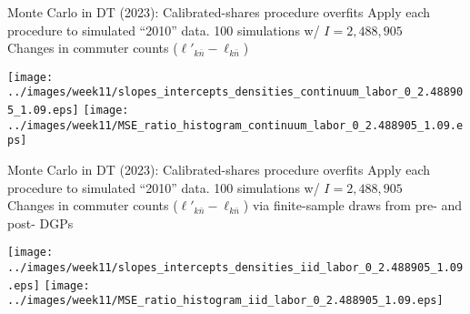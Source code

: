 \documentclass[11pt,notes=hide,aspectratio=169]{beamer}
\begin{document}
\begin{frame}[t]{Monte Carlo in DT (2023): Calibrated-shares procedure overfits}
\hypertarget{ctfl:monte_carlo:mainslide}{}
\vspace{-3mm}
\footnotesize{
Apply each procedure to simulated ``2010'' data. %
100 simulations w/ $I=2,488,905$ \\
Changes in commuter counts ($\ell'_{k\bar{n}}-\ell_{k\bar{n}}$) 
}
\vspace{-2mm}
\begin{center}
\texttt{[image: ../images/week11/slopes\_intercepts\_densities\_continuum\_labor\_0\_2.488905\_1.09.eps]}
\texttt{[image: ../images/week11/MSE\_ratio\_histogram\_continuum\_labor\_0\_2.488905\_1.09.eps]}
\\
\resizebox{0.8\textwidth}{!}{

}
\end{center}
\end{frame}
\begin{frame}{Monte Carlo in DT (2023): Calibrated-shares procedure overfits}
\footnotesize{
Apply each procedure to simulated ``2010'' data. %
100 simulations w/ $I=2,488,905$ \\
Changes in commuter counts ($\ell'_{k\bar{n}}-\ell_{k\bar{n}}$) 
via finite-sample draws from pre- and post- DGPs
}
\begin{center}
\texttt{[image: ../images/week11/slopes\_intercepts\_densities\_iid\_labor\_0\_2.488905\_1.09.eps]}
\texttt{[image: ../images/week11/MSE\_ratio\_histogram\_iid\_labor\_0\_2.488905\_1.09.eps]}
\end{center}
\vspace{-3mm}
\begin{columns}
\begin{column}{0.78\textwidth}
\resizebox{\textwidth}{!}{

}
\end{column}
\end{columns}
\end{frame}
\end{document}
